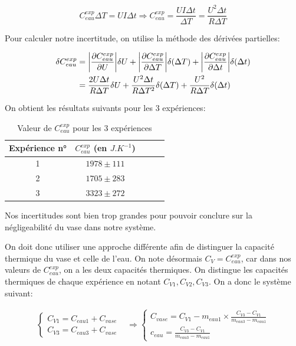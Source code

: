 \documentclass[12pt]{article}
\begin{document}
\begin{equation}
	C_{eau}^{exp} \Delta T = U I \Delta t \Rightarrow C_{eau}^{exp} = \frac{U I \Delta t}{\Delta T} = \frac{U^2\Delta t}{R \Delta T}
\end{equation}

\newpage
Pour calculer notre incertitude, on utilise la méthode des dérivées partielles:

\begin{align*}
	\delta C_{eau}^{exp} & = \abs{\frac{\partial C_{eau}^{exp}}{\partial U}} \delta U + \abs{\frac{\partial C_{eau}^{exp}}{\partial \Delta T}} \delta (\Delta T) + \abs{\frac{\partial C_{eau}^{exp}}{\partial \Delta t}} \delta (\Delta t)\\
	& = \frac{2U \Delta t}{R \Delta T} \delta U + \frac{U^2 \Delta t}{R \Delta T ^2} \delta (\Delta T) + \frac{U^2}{R \Delta T} \delta (\Delta t)\\
\end{align*}

On obtient les résultats suivants pour les 3 expériences:
\begin{table}[h!]
	\begin{center}
		\begin{tabular}{|c|c|c|c|c|}
			\hline
			Expérience n° & $C_{eau}^{exp}$ (en $J.K^{-1}$) \\ \hline
			1 & $1978 \pm 111$ \\
			2 & $1705 \pm 283$ \\
			3 & $3323 \pm 272$ \\ \hline
		\end{tabular}
	\end{center}
	\caption{Valeur de $C_{eau}^{exp}$ pour les 3 expériences}
\end{table}

Nos incertitudes sont bien trop grandes pour pouvoir conclure sur la négligeabilité du vase dans notre système.

On doit donc utiliser une approche différente afin de distinguer la capacité thermique du vase et celle de l'eau. On note désormais $C_V = C_{eau}^{exp}$, car dans nos valeurs de $C_{eau}^{exp}$, 
on a les deux capacités thermiques. On distingue les capacités thermiques de chaque expérience en notant $C_{V1}, C_{V2}, C_{V3}$. On a donc le système suivant:

\begin{align*}
	\begin{cases}
		C_{V1}=C_{eau1}+C_{vase} \\
		C_{V3}=C_{eau3}+C_{vase}
	\end{cases} 
&\Rightarrow 
	\begin{cases}
		C_{vase}= C_{V1} - m_{eau1} \times \frac{C_{V3}-C_{V1}}{m_{eau3} - m_{eau1}} \\
		c_{eau} = \frac{C_{V3}-C_{V1}}{m_{eau3} - m_{eau1}}
	\end{cases}
\end{align*}
\end{document}
